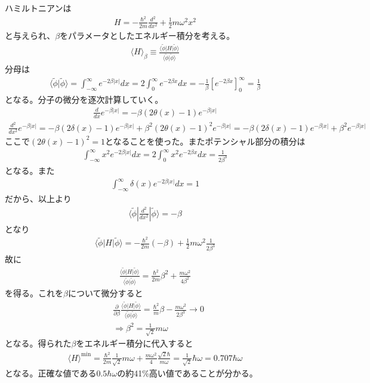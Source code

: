 \documentclass{jlreq}
\begin{document}
ハミルトニアンは
\begin{align}
    H=-\frac{\hbar^2}{2m}\frac{d^2}{dx^2}+\frac{1}{2}m\omega^2x^2
\end{align}
と与えられ、$\beta$をパラメータとしたエネルギー積分を考える。
\begin{align}
    \langle H\rangle_\beta\equiv\frac{\langle\tilde{\phi}|H|\tilde{\phi}\rangle}{\langle\tilde{\phi}|\tilde{\phi}\rangle}
\end{align}
分母は
\begin{align}
    \langle\tilde{\phi}|\tilde{\phi}\rangle=\int^\infty_{-\infty}e^{-2\beta|x|} dx=2\int^\infty_{0}e^{-2\beta x} dx = -\frac{1}{\beta}[e^{-2\beta x}]^\infty_0=\frac{1}{\beta}
\end{align}
となる。分子の微分を逐次計算していく。
\begin{align}
    \frac{d}{dx}e^{-\beta |x|}=-\beta (2\theta(x)-1)e^{-\beta |x|}
\end{align}
\begin{align}
    \frac{d^2}{dx^2}e^{-\beta |x|}=-\beta (2\delta(x)-1)e^{-\beta |x|}+\beta^2 (2\theta(x)-1)^2 e^{-\beta |x|}=-\beta (2\delta(x)-1)e^{-\beta |x|}+\beta^2 e^{-\beta |x|}
\end{align} 
ここで$(2\theta(x)-1)^2=1$となることを使った。またポテンシャル部分の積分は
\begin{align}
    \int^\infty_{-\infty} x^2 e^{-2\beta|x|}dx=2\int^{\infty}_0 x^2 e^{-2\beta x}dx=\frac{1}{2\beta^3}
\end{align}
となる。また
\begin{align}
    \int^\infty_{-\infty} \delta(x) e^{-2\beta|x|}dx=1
\end{align}
だから、以上より
\begin{align}
    \langle\tilde{\phi}|\frac{d^2}{dx^2}|\tilde{\phi}\rangle=-\beta
\end{align}
となり
\begin{align}
    \langle\tilde{\phi}|H|\tilde{\phi}\rangle=-\frac{\hbar^2}{2m}(-\beta)+\frac{1}{2}m\omega^2\frac{1}{2\beta^3}
\end{align}
故に
\begin{align}
    \frac{\langle\tilde{\phi}|H|\tilde{\phi}\rangle}{\langle\tilde{\phi}|\tilde{\phi}\rangle}=\frac{\hbar^2}{2m}\beta^2+\frac{m\omega^2}{4\beta^2}
\end{align}
を得る。これを$\beta$について微分すると
\begin{align}
    &\frac{\partial}{\partial\beta}\frac{\langle\tilde{\phi}|H|\tilde{\phi}\rangle}{\langle\tilde{\phi}|\tilde{\phi}\rangle}=\frac{\hbar^2}{m}\beta-\frac{m\omega^2}{2\beta^3}\rightarrow 0 \\
    &\Rightarrow \beta^2=\frac{1}{\sqrt{2}}m\omega
\end{align}
となる。得られた$\beta$をエネルギー積分に代入すると
\begin{align}
    \langle H\rangle^\text{min}=\frac{\hbar^2}{2m}\frac{1}{\sqrt{2}}m\omega+\frac{m\omega^2}{4} \frac{\sqrt{2}\hbar}{m\omega}=\frac{1}{\sqrt{2}}\hbar\omega=0.707\hbar\omega
\end{align}
となる。正確な値である$0.5\hbar\omega$の約41\%高い値であることが分かる。
\end{document}
